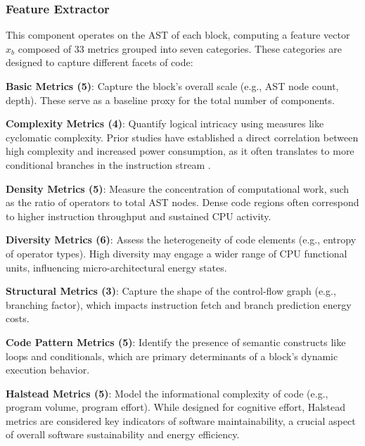 \subsubsection{Feature Extractor}

This component operates on the AST of each block, computing a feature vector \( x_b \) composed of 33 metrics grouped into seven categories. These categories are designed to capture different facets of code: 

\noindent \textbf{Basic Metrics (5)}: Capture the block's overall scale (e.g., AST node count, depth). These serve as a baseline proxy for the total number of components.

\noindent
\textbf{Complexity Metrics (4)}: Quantify logical intricacy using measures like cyclomatic complexity\cite{1702388}. Prior studies have established a direct correlation between high complexity and increased power consumption, as it often translates to more conditional branches in the instruction stream \cite{Keong2015MetricsPower}.

\noindent
\textbf{Density Metrics (5)}: Measure the concentration of computational work, such as the ratio of operators to total AST nodes. Dense code regions often correspond to higher instruction throughput and sustained CPU activity.

\noindent
\textbf{Diversity Metrics (6)}: Assess the heterogeneity of code elements (e.g., entropy of operator types). High diversity may engage a wider range of CPU functional units, influencing micro-architectural energy states.

\noindent
\textbf{Structural Metrics (3)}: Capture the shape of the control-flow graph (e.g., branching factor), which impacts instruction fetch and branch prediction energy costs. \cite{10.1145/3212695}

\noindent
\textbf{Code Pattern Metrics (5)}: Identify the presence of semantic constructs like loops and conditionals, which are primary determinants of a block's dynamic execution behavior.

\noindent
\textbf{Halstead Metrics (5)}: Model the informational complexity of code (e.g., program volume, program effort)\cite{10.5555/540137}. While designed for cognitive effort, Halstead metrics are considered key indicators of software maintainability, a crucial aspect of overall software sustainability and energy efficiency. 

